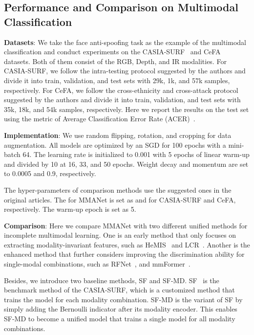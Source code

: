 \documentclass[10pt,twocolumn,letterpaper]{article}
\begin{document}
\subsection{Performance and Comparison on Multimodal Classification}

\textbf{Datasets}: We take the face anti-spoofing task as the example of the multimodal classification and conduct experiments on the CASIA-SURF~\cite{surf} and CeFA~\cite{cefa} datasets. Both of them consist of the RGB, Depth, and IR modalities. For CASIA-SURF, we follow the intra-testing protocol suggested by the authors and divide it into train, validation, and test sets with 29k, 1k, and 57k samples, respectively. For CeFA, we follow the cross-ethnicity and cross-attack protocol suggested by the authors and divide it into train, validation, and test sets with 35k, 18k, and 54k samples, respectively. Here we report the results on the test set using the metric of Average Classification Error Rate (ACER)~\cite{surf}.



\textbf{Implementation}: We use random flipping, rotation, and cropping for data augmentation. All models are optimized by an SGD for 100 epochs with a mini-batch 64. The learning rate is initialized to 0.001 with 5 epochs of linear warm-up and divided by 10 at 16, 33, and 50 epochs. Weight decay and momentum are set to 0.0005 and 0.9, respectively.

The hyper-parameters of comparison methods use the suggested ones in the original articles. The  for MMANet is set as  and  for CASIA-SURF and CeFA, respectively. The warm-up epoch  is set as 5.

\textbf{Comparison}: Here we compare MMANet with two different unified methods for incomplete multimodal learning. One is an early method that only focuses on extracting modality-invariant features, such as HeMIS~\cite{hemis} and LCR~\cite{lcr}. Another is the enhanced method that further considers improving the discrimination ability for single-modal combinations, such as RFNet~\cite{rfnet}, and mmFormer~\cite{mmformer}. 

Besides, we introduce two baseline methods, SF and SF-MD. SF~\cite{surf} is the benchmark method of the CASIA-SURF, which is a customized method that trains the model for each modality combination. SF-MD is the variant of SF by simply adding the Bernoulli indicator after its modality encoder. This enables SF-MD to become a unified model that trains a single model for all modality combinations.
\end{document}
